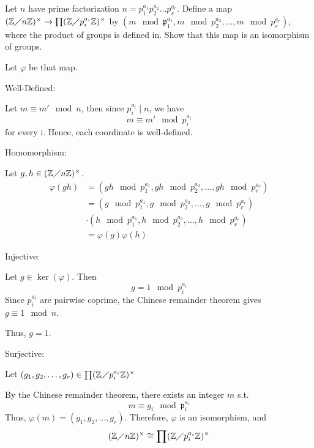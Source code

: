 \documentclass[12pt, letterpaper]{article}
\newcommand{\Z}{\mathbb{Z}}
\newcommand{\p}{\mathfrak{p}}
\begin{document}
\begin{subproblem}{}
    Let $n$ have prime factorization $n=p_1^{a_1}p_2^{a_2}\dots p_r^{a_r}$. Define a map $(\Z \diagup n\Z)^\times \to \prod (\Z \diagup p_i^{a_i} \Z)^\times$ by $(m \mod \p_1^{a_1}, m \mod p_2^{a_2},\dots,m \mod p_r^{a_r})$, where the product of groups is defined in. Show that this map is an isomorphism of groups.
\end{subproblem}
\begin{problemproof}
    Let $\varphi$ be that map.

    Well-Defined:

    Let $m \equiv m' \mod n$, then since $p_i^{a_i} \mid n$, we have
    \[m \equiv m' \mod p_i^{a_i}\]
    for every i. Hence, each coordinate is well-defined.

    Homomorphism:

    Let $g,h \in (\Z \diagup n\Z)^\times$.
    \begin{align*}
        \varphi(gh) &=(gh \mod p_1^{a_1}, gh \mod p_2^{a_2},\dots,gh\mod p_r^{a_r})\\
                    &=(g \mod p_1^{a_1}, g \mod p_2^{a_2},\dots,g\mod p_r^{a_r})\\ 
                    &\cdot (h \mod p_1^{a_1}, h \mod p_2^{a_2},\dots,h\mod p_r^{a_r})\\
                    &=\varphi(g)\varphi(h)
    \end{align*}

    Injective:

    Let $g \in \ker(\varphi)$. Then
    \[g = 1 \mod p_i^{a_i}\] 
    Since $p_i^{a_i}$ are pairwise coprime, the Chinese remainder theorem gives $g \equiv 1 \mod n$.

    Thus, $g=1$.

    Surjective:

    Let $(g_1, g_2,\dots,g_r) \in \prod (\Z \diagup p_i^{a_i} \Z)^\times$

    By the Chinese remainder theorem, there exists an integer $m$ s.t.
    \[m \equiv g_i \mod \p_i^{a_i}\]
    Thus, $\varphi(m)=(g_1,g_2,\dots,g_r)$.
    Therefore, $\varphi$ is an isomorphism, and
    \[(\Z \diagup n\Z)^\times \cong \prod (\Z \diagup p_i^{a_i} \Z)^\times\]
\end{problemproof}
\end{document}
